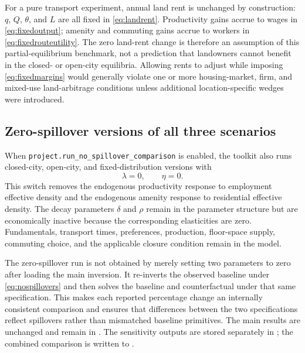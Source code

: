 \documentclass[11pt,a4paper]{article}
\begin{document}
For a pure transport experiment, annual land rent is unchanged by construction:
$q$, $Q$, $\theta$, and $L$ are all fixed in \eqref{eq:landrent}. Productivity
gains accrue to wages in \eqref{eq:fixedoutput}; amenity and commuting gains
accrue to workers in \eqref{eq:fixedrouteutility}. The zero land-rent change is
therefore an assumption of this partial-equilibrium benchmark, not a prediction
that landowners cannot benefit in the closed- or open-city equilibria. Allowing
rents to adjust while imposing \eqref{eq:fixedmargins} would generally violate
one or more housing-market, firm, and mixed-use land-arbitrage conditions unless
additional location-specific wedges were introduced.

\subsection{Zero-spillover versions of all three scenarios}
When \texttt{project.run\_no\_spillover\_comparison} is enabled, the toolkit
also runs closed-city, open-city, and fixed-distribution versions with
\begin{equation}
 \lambda=0,\qquad \eta=0.                              \label{eq:nospillovers}
\end{equation}
This switch removes the endogenous productivity response to employment
effective density and the endogenous amenity response to residential effective
density. The decay parameters $\delta$ and $\rho$ remain in the parameter
structure but are economically inactive because the corresponding
elasticities are zero. Fundamentals, transport times, preferences, production,
floor-space supply, commuting choice, and the applicable closure condition
remain in the model.

The zero-spillover run is not obtained by merely setting two parameters to zero
after loading the main inversion. It re-inverts the observed baseline under
\eqref{eq:nospillovers} and then solves the baseline and counterfactual under
that same specification. This makes each reported percentage change an
internally consistent comparison and ensures that differences between the two
specifications reflect spillovers rather than mismatched baseline primitives.
The main results are unchanged and remain in . The
sensitivity outputs are stored separately in
; the combined comparison is written to
.
\end{document}

